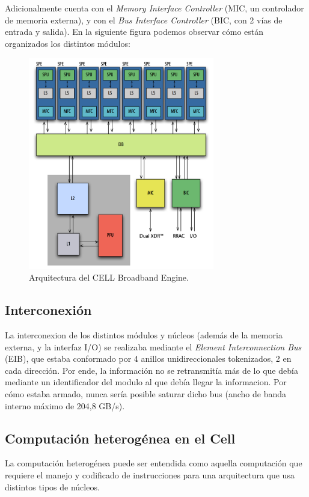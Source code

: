 \documentclass[10pt,compsoc]{IEEEtran}
\begin{document}
	Adicionalmente cuenta con el \textit{Memory Interface Controller} (MIC, un controlador de memoria externa), y con el \textit{Bus Interface Controller} (BIC, con 2 vías de entrada y salida). En la siguiente figura podemos observar cómo están organizados los distintos módulos:
	
	\begin{figure}[H]
		\centering
		\includegraphics[width=3.2in]{imgs/arquitecturacell.png}
		\caption{Arquitectura del CELL Broadband Engine.}
		\label{fig3}
	\end{figure}
	
	\subsection{Interconexión} 
	\noindent La interconexion de los distintos módulos y núcleos (además de la memoria externa, y la interfaz I/O) se realizaba mediante el \textit{Element Interconnection Bus} (EIB), que estaba conformado por 4 anillos unidireccionales tokenizados, 2 en cada dirección. Por ende, la información no se retransmitía más de lo que debía mediante un identificador del modulo al que debía llegar la informacion. 
	Por cómo estaba armado, nunca sería posible saturar dicho bus (ancho de banda interno máximo de 204,8 GB/s).
	

	
	\subsection{Computación heterogénea en el Cell}%
	\noindent La computación heterogénea puede ser entendida como aquella computación que requiere el manejo y codificado de instrucciones para una arquitectura que usa distintos tipos de núcleos.\newline
	
\end{document}
